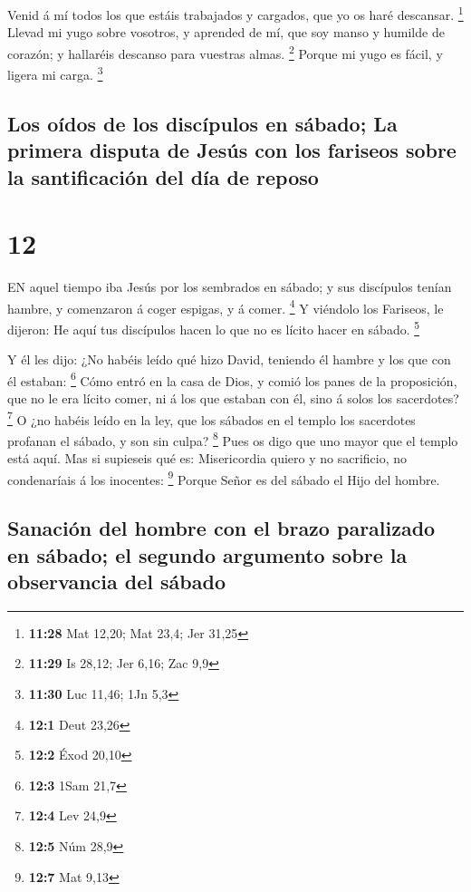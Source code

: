  Venid á mí todos los que estáis trabajados y cargados, que
yo os haré descansar. \footnote{\textbf{11:28} Mat 12,20; Mat 23,4; Jer
  31,25}  Llevad mi yugo sobre vosotros, y aprended de mí,
que soy manso y humilde de corazón; y hallaréis descanso para vuestras
almas. \footnote{\textbf{11:29} Is 28,12; Jer 6,16; Zac 9,9}
 Porque mi yugo es fácil, y ligera mi carga. \footnote{\textbf{11:30}
  Luc 11,46; 1Jn 5,3}

\hypertarget{los-ouxeddos-de-los-discuxedpulos-en-suxe1bado-la-primera-disputa-de-jesuxfas-con-los-fariseos-sobre-la-santificaciuxf3n-del-duxeda-de-reposo}{%
\subsection{Los oídos de los discípulos en sábado; La primera disputa de
Jesús con los fariseos sobre la santificación del día de
reposo}\label{los-ouxeddos-de-los-discuxedpulos-en-suxe1bado-la-primera-disputa-de-jesuxfas-con-los-fariseos-sobre-la-santificaciuxf3n-del-duxeda-de-reposo}}

\hypertarget{section-11}{%
\section{12}\label{section-11}}

 EN aquel tiempo iba Jesús por los sembrados en sábado; y
sus discípulos tenían hambre, y comenzaron á coger espigas, y á comer.
\footnote{\textbf{12:1} Deut 23,26}  Y viéndolo los
Fariseos, le dijeron: He aquí tus discípulos hacen lo que no es lícito
hacer en sábado. \footnote{\textbf{12:2} Éxod 20,10}

 Y él les dijo: ¿No habéis leído qué hizo David, teniendo él
hambre y los que con él estaban: \footnote{\textbf{12:3} 1Sam 21,7}
 Cómo entró en la casa de Dios, y comió los panes de la
proposición, que no le era lícito comer, ni á los que estaban con él,
sino á solos los sacerdotes? \footnote{\textbf{12:4} Lev 24,9}
 O ¿no habéis leído en la ley, que los sábados en el templo
los sacerdotes profanan el sábado, y son sin culpa? \footnote{\textbf{12:5}
  Núm 28,9}  Pues os digo que uno mayor que el templo está
aquí.  Mas si supieseis qué es: Misericordia quiero y no
sacrificio, no condenaríais á los inocentes: \footnote{\textbf{12:7} Mat
  9,13}  Porque Señor es del sábado el Hijo del hombre.

\hypertarget{sanaciuxf3n-del-hombre-con-el-brazo-paralizado-en-suxe1bado-el-segundo-argumento-sobre-la-observancia-del-suxe1bado}{%
\subsection{Sanación del hombre con el brazo paralizado en sábado; el
segundo argumento sobre la observancia del
sábado}\label{sanaciuxf3n-del-hombre-con-el-brazo-paralizado-en-suxe1bado-el-segundo-argumento-sobre-la-observancia-del-suxe1bado}}

